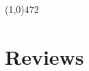 \documentclass[margin,line]{resume}
\begin{document}
\begin{resume}
%	
	
%	
%	
%	
	





    \vspace{-5.0mm}
    \line(1,0){472}
    \vspace{-5.0mm}

    \section{\mysidestyle Reviews}


\end{resume}
\end{document}
